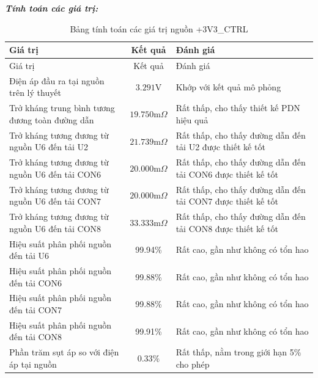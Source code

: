             \textbf{\textit{Tính toán các giá trị:}}
            \begin{longtable}{|p{}|c|p{}|}           
                \caption{Bảng tính toán các giá trị nguồn +3V3\_CTRL}\\
                \hline
                Giá trị & Kết quả & Đánh giá \\
                \hline
                \endfirsthead
                
                \hline
                Giá trị & Kết quả & Đánh giá \\
                \hline
                \endhead
                
                \hline
                \endfoot
                
                \hline
                \endlastfoot
                
                Điện áp đầu ra tại nguồn trên lý thuyết & $3.291\text{V}$ & Khớp với kết quả mô phỏng \\
                Trở kháng trung bình tương đương toàn đường dẫn & $19.750 \text{m}\Omega$ & Rất thấp, cho thấy thiết kế PDN hiệu quả \\
                Trở kháng tương đương từ nguồn U6 đến tải U2 & $21.739 \text{m}\Omega$ & Rất thấp, cho thấy đường dẫn đến tải U2 được thiết kế tốt \\
                Trở kháng tương đương từ nguồn U6 đến tải CON6 & $20.000 \text{m}\Omega$ & Rất thấp, cho thấy đường dẫn đến tải CON6 được thiết kế tốt \\
                Trở kháng tương đương từ nguồn U6 đến tải CON7 & $20.000 \text{m}\Omega$ & Rất thấp, cho thấy đường dẫn đến tải CON7 được thiết kế tốt \\
                Trở kháng tương đương từ nguồn U6 đến tải CON8 & $33.333 \text{m}\Omega$ & Rất thấp, cho thấy đường dẫn đến tải CON8 được thiết kế tốt \\
                Hiệu suất phân phối nguồn đến tải U6 & 99.94\% & Rất cao, gần như không có tổn hao \\
                Hiệu suất phân phối nguồn đến tải CON6 & 99.88\% & Rất cao, gần như không có tổn hao \\
                Hiệu suất phân phối nguồn đến tải CON7 & 99.88\% & Rất cao, gần như không có tổn hao \\
                Hiệu suất phân phối nguồn đến tải CON8 & 99.91\% & Rất cao, gần như không có tổn hao \\
                Phần trăm sụt áp so với điện áp tại nguồn & $\mathbf{0.33\%}$ & Rất thấp, nằm trong giới hạn 5\% cho phép
                \label{tab:3v3_ctrl_calculation}\\

                \hline
            \end{longtable}

